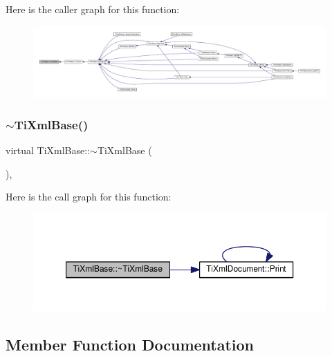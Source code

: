 Here is the caller graph for this function\+:\nopagebreak
\begin{figure}[H]
\begin{center}
\leavevmode
\includegraphics[width=350pt]{class_ti_xml_base_ac6753fe8a2c89669038fcf281cb301bf_icgraph}
\end{center}
\end{figure}
\mbox{\label{class_ti_xml_base_ad1837ecb25a913612fa1115f090cbb56}} 
\subsubsection{\texorpdfstring{$\sim$\+Ti\+Xml\+Base()}{~TiXmlBase()}}
{\footnotesize\ttfamily virtual Ti\+Xml\+Base\+::$\sim$\+Ti\+Xml\+Base (\begin{DoxyParamCaption}{ }\end{DoxyParamCaption})\hspace{0.3cm}{\ttfamily [inline]}, {\ttfamily [virtual]}}

Here is the call graph for this function\+:\nopagebreak
\begin{figure}[H]
\begin{center}
\leavevmode
\includegraphics[width=350pt]{class_ti_xml_base_ad1837ecb25a913612fa1115f090cbb56_cgraph}
\end{center}
\end{figure}


\subsection{Member Function Documentation}
\mbox{\label{class_ti_xml_base_ad283b95d9858d5d78c334f4a61b07bb4}} 

